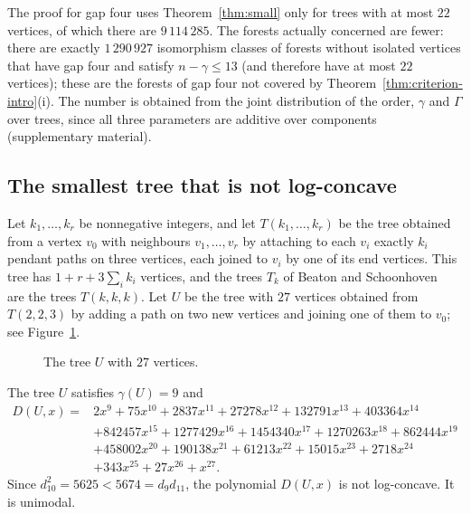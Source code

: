 \documentclass[smallextended,envcountsect,envcountsame]{svjour3}
\begin{document}
\begin{remark}\label{rem:boundary}
The proof for gap four uses Theorem~\ref{thm:small} only for trees with at
most $22$ vertices, of which there are $9\,114\,285$. The forests actually
concerned are fewer: there are exactly $1\,290\,927$ isomorphism classes of
forests without isolated vertices that have gap four and satisfy
$n-\gamma\le13$ (and therefore have at most $22$ vertices); these are the
forests of gap four not covered by Theorem~\ref{thm:criterion-intro}(i). The
number is obtained from the joint distribution of the order, $\gamma$ and
$\Gamma$ over trees, since all three parameters are additive over components
(supplementary material).
\end{remark}

\subsection{The smallest tree that is not log-concave}

Let $k_1,\dots,k_r$ be nonnegative integers, and let $T(k_1,\dots,k_r)$ be
the tree obtained from a vertex $v_0$ with neighbours $v_1,\dots,v_r$ by attaching to each
$v_i$ exactly $k_i$ pendant paths on three vertices, each joined to $v_i$ by
one of its end vertices. This tree has $1+r+3\sum_i k_i$ vertices, and the
trees $T_k$ of Beaton and Schoonhoven~\cite{BS} are the trees $T(k,k,k)$.
Let $U$ be the tree with $27$ vertices obtained from $T(2,2,3)$ by adding a
path on two new vertices and joining one of them to $v_0$; see
Figure~\ref{fig:U}.

\begin{figure}[ht]
\centering
{}
\caption{The tree $U$ with $27$ vertices.}\label{fig:U}
\end{figure}

\begin{proposition}\label{prop:U}
The tree $U$ satisfies $\gamma(U)=9$ and
\begingroup\small\begin{align*}
 D(U,x)={}& 2x^{9}+75x^{10}+2837x^{11}+27278x^{12}+132791x^{13}+403364x^{14}\\
 &+842457x^{15}+1277429x^{16}+1454340x^{17}+1270263x^{18}+862444x^{19}\\
 &+458002x^{20}+190138x^{21}+61213x^{22}+15015x^{23}+2718x^{24}\\
 &+343x^{25}+27x^{26}+x^{27}.
\end{align*}\endgroup
Since $d_{10}^2=5625<5674=d_{9}d_{11}$, the polynomial $D(U,x)$ is not
log-concave. It is unimodal.
\end{proposition}
\end{document}
